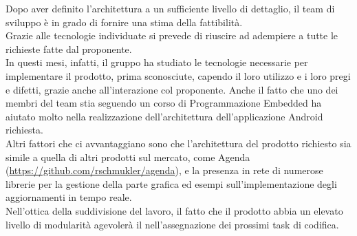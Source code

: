 Dopo aver definito l'architettura a un sufficiente livello di dettaglio, il team di sviluppo è in grado di fornire una stima della fattibilità.\\
Grazie alle tecnologie individuate si prevede di riuscire ad adempiere a tutte le richieste fatte dal proponente.\\
In questi mesi, infatti, il gruppo ha studiato le tecnologie necessarie per implementare il prodotto, prima sconosciute, capendo il loro utilizzo e i loro pregi e difetti, grazie anche all'interazione col proponente. Anche il fatto che uno dei membri del team stia seguendo un corso di Programmazione Embedded ha aiutato molto nella realizzazione dell'architettura dell'applicazione Android richiesta. \\
Altri fattori che ci avvantaggiano sono che l'architettura del prodotto richiesto sia simile a quella di altri prodotti sul mercato, come Agenda (\url{https://github.com/rschmukler/agenda}), e la presenza in rete di numerose librerie per la gestione della parte grafica ed esempi sull'implementazione degli aggiornamenti in tempo reale.\\
Nell'ottica della suddivisione del lavoro, il fatto che il prodotto abbia un elevato livello di modularità agevolerà il  nell'assegnazione dei prossimi task di codifica.\\
